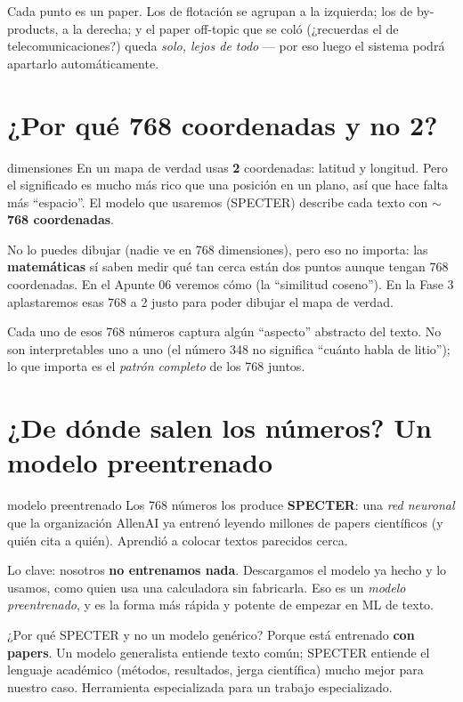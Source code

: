 \documentclass[11pt,a4paper]{article}
\begin{document}
Cada punto es un paper. Los de flotación se agrupan a la izquierda; los de by-products, a
la derecha; y el paper off-topic que se coló (¿recuerdas el de telecomunicaciones?) queda
\emph{solo, lejos de todo} --- por eso luego el sistema podrá apartarlo automáticamente.

\section{¿Por qué 768 coordenadas y no 2?}

\begin{concepto}{dimensiones}
En un mapa de verdad usas \textbf{2} coordenadas: latitud y longitud. Pero el significado
es mucho más rico que una posición en un plano, así que hace falta más ``espacio''. El
modelo que usaremos (SPECTER) describe cada texto con \textbf{$\sim$768 coordenadas}.

No lo puedes dibujar (nadie ve en 768 dimensiones), pero eso no importa: las
\textbf{matemáticas} sí saben medir qué tan cerca están dos puntos aunque tengan 768
coordenadas. En el Apunte 06 veremos cómo (la ``similitud coseno''). En la Fase 3
aplastaremos esas 768 a 2 justo para poder dibujar el mapa de verdad.
\end{concepto}

Cada uno de esos 768 números captura algún ``aspecto'' abstracto del texto. No son
interpretables uno a uno (el número 348 no significa ``cuánto habla de litio''); lo que
importa es el \emph{patrón completo} de los 768 juntos.

\section{¿De dónde salen los números? Un modelo preentrenado}

\begin{concepto}{modelo preentrenado}
Los 768 números los produce \textbf{SPECTER}: una \emph{red neuronal} que la organización
AllenAI ya entrenó leyendo millones de papers científicos (y quién cita a quién). Aprendió
a colocar textos parecidos cerca.

Lo clave: nosotros \textbf{no entrenamos nada}. Descargamos el modelo ya hecho y lo usamos,
como quien usa una calculadora sin fabricarla. Eso es un \emph{modelo preentrenado}, y es
la forma más rápida y potente de empezar en ML de texto.
\end{concepto}

\begin{ojo}
¿Por qué SPECTER y no un modelo genérico? Porque está entrenado \textbf{con papers}.
Un modelo generalista entiende texto común; SPECTER entiende el lenguaje académico (métodos,
resultados, jerga científica) mucho mejor para nuestro caso. Herramienta especializada para
un trabajo especializado.
\end{ojo}
\end{document}
